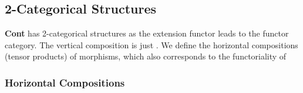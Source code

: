 {\subsection{2-Categorical Structures}

\textbf{Cont} has 2-categorical structures as the extension functor leads to the functor category. The vertical composition is just . We define the horizontal compositions (tensor products) of morphisms, which also corresponds to the functoriality of 

\subsubsection*{Horizontal Compositions}

\begin{code}%
\>[0]\AgdaSpace{}%
\AgdaSymbol{:}\AgdaSpace{}%
\AgdaSpace{}%
\AgdaSpace{}%
\AgdaSpace{}%
\AgdaSpace{}%
\AgdaSpace{}%
\AgdaSpace{}%
\AgdaSpace{}%
\AgdaSpace{}%
\AgdaSpace{}%
\AgdaSymbol{(}\AgdaSpace{}%
\AgdaSpace{}%
\AgdaSymbol{)}\AgdaSpace{}%
\AgdaSymbol{(}\AgdaSpace{}%
\AgdaSpace{}%
\AgdaSymbol{)}\<%
\\
\>[0]\AgdaSymbol{(}\AgdaSpace{}%
\AgdaSpace{}%
\AgdaSymbol{)}\AgdaSpace{}%
\AgdaSpace{}%
\AgdaSymbol{(}\AgdaSpace{}%
\AgdaSpace{}%
\AgdaSymbol{)}\<%
\\
\>[0][@{}l@{\AgdaIndent{0}}]%
\>[2]\AgdaSymbol{=}\AgdaSpace{}%
\AgdaSpace{}%
\AgdaSymbol{(}\AgdaSpace{}%
\AgdaOperator{\AgdaInductiveConstructor{,}}\AgdaSpace{}%
\AgdaSymbol{)}\AgdaSpace{}%
\AgdaSpace{}%
\AgdaSpace{}%
\AgdaSpace{}%
\AgdaOperator{\AgdaInductiveConstructor{,}}\AgdaSpace{}%
\AgdaSpace{}%
\AgdaSpace{}%
\AgdaSpace{}%
\AgdaSpace{}%
\AgdaSpace{}%
\AgdaSpace{}%
\AgdaSymbol{\})}\<%
\\

\end{code}}
